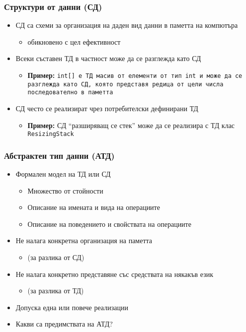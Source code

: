 \documentclass{beamer}
\begin{document}
\begin{frame}
  \frametitle{Структури от данни (СД)}

  \begin{itemize}[<+->]
  \item СД са схеми за организация на даден вид данни в паметта на компютъра
    \begin{itemize}
    \item обикновено с цел ефективност
    \end{itemize}
  \item Всеки съставен ТД в частност може да се разглежда като СД
    \begin{itemize}
    \item \textbf{Пример:} \tt{int[]} е ТД масив от елементи от тип \tt{int} и може да се разглежда като СД, която представя редица от цели числа последователно в паметта
    \end{itemize}
  \item СД често се реализират чрез потребителски дефинирани ТД
    \begin{itemize}
    \item \textbf{Пример:} СД ``разширяващ се стек'' може да се реализира с ТД клас \tt{ResizingStack}
    \end{itemize}
  \end{itemize}
\end{frame}

\begin{frame}
  \frametitle{Абстрактен тип данни (АТД)}

  \begin{itemize}[<+->]
  \item Формален модел на ТД или СД
    \begin{itemize}
    \item Множество от стойности
    \item Описание на имената и вида на операциите
    \item Описание на поведението и свойствата на операциите
    \end{itemize}
  \item Не налага конкретна организация на паметта
    \begin{itemize}
    \item (за разлика от СД)
    \end{itemize}
  \item Не налага конкретно представяне със средствата на някакъв език
    \begin{itemize}
    \item (за разлика от ТД)
    \end{itemize}
  \item Допуска една или повече реализации
  \item \alert{Какви са предимствата на АТД?}
  \end{itemize}
\end{frame}
\end{document}
